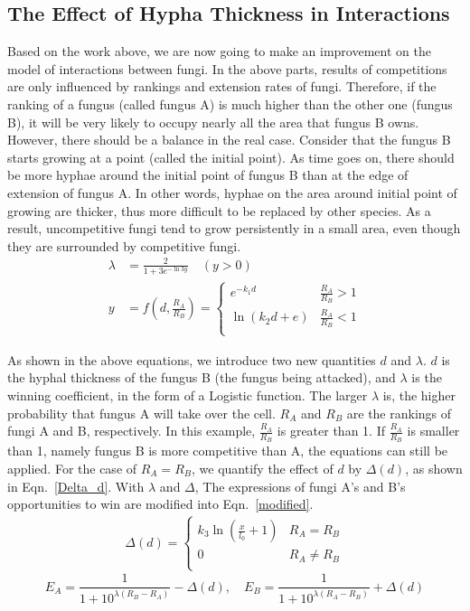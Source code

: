 \documentclass[a4paper,12pt]{article}
\begin{document}
\subsection{The Effect of Hypha Thickness in Interactions}
\par Based on the work above, we are now going to make an improvement on the model of interactions between fungi. In the above parts, results of competitions are only influenced by rankings and extension rates of fungi. Therefore, if the ranking of a fungus (called fungus A) is much higher than the other one (fungus B), it will be very likely to occupy nearly all the area that fungus B owns. However, there should be a balance in the real case. Consider that the fungus B starts growing at a point (called the initial point). As time goes on, there should be more hyphae around the initial point of fungus B than at the edge of extension of fungus A. In other words, hyphae on the area around initial point of growing are thicker, thus more difficult to be replaced by other species. As a result, uncompetitive fungi tend to grow persistently in a small area, even though they are surrounded by competitive fungi.
\begin{align*}
	\label{lambda}
	\lambda &=\frac{2}{1+3e^{-\ln3 y}} \quad (y>0)\\
	y &=f(d,\frac{R_A}{R_B})=
	\begin{cases}
		e^{-k_1d} & \frac{R_A}{R_B}>1\\
		\ln (k_2d+e)&\frac{R_A}{R_B}<1\\
	\end{cases}
\end{align*}
\par As shown in the above equations, we introduce two new quantities $d$ and $\lambda$. $d$ is the hyphal thickness of the fungus B (the fungus being attacked), and $\lambda$ is the winning coefficient, in the form of a Logistic function. The larger $\lambda$ is, the higher probability that fungus A will take over the cell. $R_A$ and $R_B$ are the rankings of fungi A and B, respectively. In this example, $\frac{R_A}{R_B}$ is greater than 1. If $\frac{R_A}{R_B}$ is smaller than 1, namely fungus B is more competitive than A, the equations can still be applied. For the case of $R_A=R_B$, we quantify the effect of $d$ by $\Delta(d)$, as shown in Eqn.~\eqref{Delta_d}. With $\lambda$ and $\Delta$, The expressions of fungi A's and B's opportunities to win are modified into Eqn.~\eqref{modified}.
\begin{eqnarray} \label{Delta_d}
	\Delta(d)=
	\begin{cases}
		k_3 \ln (\frac{x}{l_0}+1) & R_A=R_B\\ 
		0 & R_A \neq R_B\\
	\end{cases}
\end{eqnarray}
\begin{equation}
	\label{modified}
	E_A=\frac{1}{1+10^{\lambda(R_B-R_A)}}-\Delta(d), \quad E_B=\frac{1}{1+10^{\lambda(R_A-R_B)}}+\Delta(d)  
\end{equation}
\end{document}
